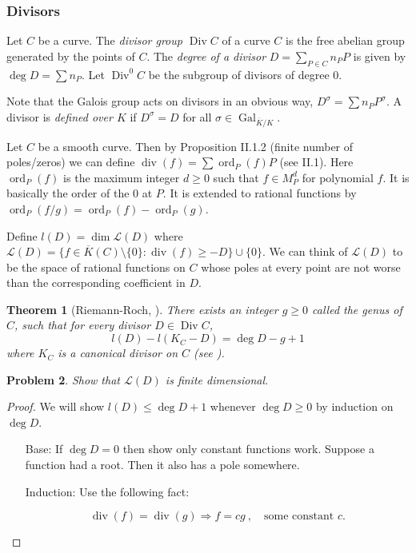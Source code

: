 \documentclass[11pt]{article}
\newcommand{\st}{\colon}
\newcommand{\Div}{\operatorname{Div}}
\renewcommand{\div}{\operatorname{div}} %
\newcommand{\gal}{\operatorname{Gal}}
\newcommand{\ord}{\operatorname{ord}}
\theoremstyle{plain}%
\newtheorem{thm}{Theorem}[section]
\newtheorem{prob}[thm]{Problem}
\theoremstyle{definition}
\theoremstyle{remark}
\begin{document}
\subsubsection{Divisors}

Let $C$ be a curve. The \emph{divisor group $\Div C$} of a curve $C$ is the free abelian group generated by the points of $C$. The \emph{degree of a divisor} $D = \sum_{P\in C} n_P P$ is given by $\deg D = \sum n_P$. Let $\Div^0 C$ be the subgroup of divisors of degree $0$.

Note that the Galois group acts on divisors in an obvious way, $D^\sigma = \sum n_P P^\sigma$. A divisor is \emph{defined over $K$} if $D^\sigma = D$ for all $\sigma\in\gal_{\overline{K}/K}$.

Let $C$ be a smooth curve. Then by Proposition II.1.2 (finite number of poles/zeros) we can define $\div(f) = \sum \ord_P(f) P$ (see II.1). Here $\ord_P(f)$ is the maximum integer $d\geq 0$ such that $f\in M^d_P$ for polynomial $f$. It is basically the order of the $0$ at $P$. It is extended to rational functions by $\ord_P(f/g) = \ord_P(f) - \ord_P(g)$.

Define $l(D) = \dim \mathscr{L}(D)$ where $\mathscr{L}(D) = \{f\in\overline{K}(C)\setminus\{0\} \st \div(f) \geq -D \}\cup\{0\}$. We can think of $\mathscr{L}(D)$ to be the space of rational functions on $C$ whose poles at every point are not worse than the corresponding coefficient in $D$.

\begin{thm}[Riemann-Roch, {\cite[II.5.4]{silverman1}}]
	There exists an integer $g\geq 0$ called the genus of $C$, such that for every divisor $D\in\Div C$,
	$$
	l(D) - l(K_C - D) = \deg D - g + 1
	$$
	where $K_C$ is a canonical divisor on $C$ (see \cite[II.4.4]{silverman1}).
\end{thm}

\begin{prob}
	Show that $\mathscr{L}(D)$ is finite dimensional.
\end{prob}
\begin{proof}
	We will show $l(D)\leq \deg D + 1$ whenever $\deg D \geq 0$ by induction on $\deg D$.
	
	\begin{enumerate}
		\item[Base:] If $\deg D = 0$ then show only constant functions work. Suppose a function had a root. Then it also has a pole somewhere.
		
		\item[Induction:] Use the following fact:
		
		$$
		\div(f) = \div(g) \Rightarrow f=cg \ ,\quad \text{some constant $c$}.
		$$
	\end{enumerate}
\end{proof}
\end{document}
